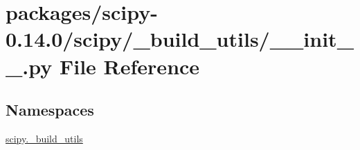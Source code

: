 \hypertarget{packages_2scipy-0_814_80_2scipy_2__build__utils_2____init_____8py}{}\section{packages/scipy-\/0.14.0/scipy/\+\_\+build\+\_\+utils/\+\_\+\+\_\+init\+\_\+\+\_\+.py File Reference}
\label{packages_2scipy-0_814_80_2scipy_2__build__utils_2____init_____8py}
\subsection*{Namespaces}
\begin{DoxyCompactItemize}
\item 
 \hyperlink{namespacescipy_1_1__build__utils}{scipy.\+\_\+build\+\_\+utils}
\end{DoxyCompactItemize}
